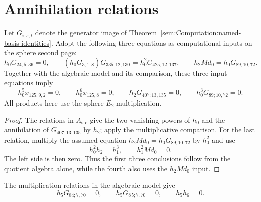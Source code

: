 \section{Annihilation relations}


\begin{theorem}
\label{sem:AdamsComputation:primitive-relation-inputs}
\label{sem:AdamsComputation:primitive-obstruction-relations}
Let $G_{i;s,t}$ denote the generator image of
Theorem~\ref{sem:Computation:named-basis-identities}. Adopt the following
three equations as computational inputs on the sphere second page:
\[
 h_0G_{24;5,36}=0,\qquad
 (h_0G_{3;1,8})G_{335;12,130}=h_0^2G_{425;12,137},\qquad
 h_2Md_0=h_0G_{89;10,72}.
\]
Together with the algebraic model and its comparison, these three
input equations imply
\[
 h_0^5x_{125,9,2}=0,\qquad h_0^6x_{125,8}=0,\qquad
 h_2G_{407;13,135}=0,\qquad h_0^3G_{89;10,72}=0.
\]
All products here use the sphere $E_2$ multiplication.
\end{theorem}
\begin{proof}
The relations in $A_{\mathrm{src}}$ give the two vanishing powers of
$h_0$ and the annihilation of $G_{407;13,135}$ by $h_2$; apply the
multiplicative comparison. For the last relation, multiply the assumed
equation $h_2Md_0=h_0G_{89;10,72}$ by $h_0^2$ and use
\[
 h_0^2h_2=h_1^3,\qquad h_1^2Md_0=0.
\]
The left side is then zero. Thus the first three conclusions follow
from the quotient algebra alone, while the fourth also uses the
$h_2Md_0$ input.
\end{proof}

\begin{theorem}
\label{sem:Computation:theta-product-certificates}
The multiplication relations in the algebraic model give
\[h_5G_{84;7,70}=0,\qquad h_5G_{85;7,70}=0,\qquad h_5h_6=0.\]
\end{theorem}

